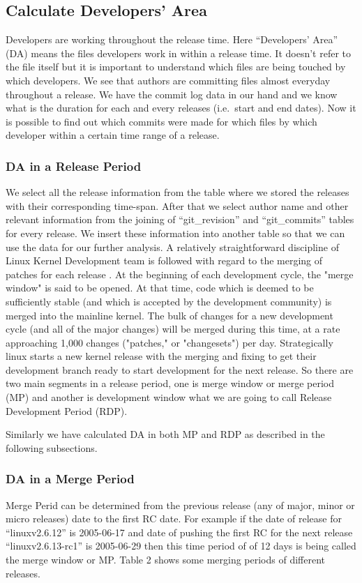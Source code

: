 \documentclass{acm_proc_article-sp}
\begin{document}
\subsection{Calculate Developers' Area}
Developers are working throughout the release time. Here ``Developers' Area'' (DA) means the files developers work in within a release time. It doesn't refer to the file itself but it is important to understand which files are being touched by which developers. We see that authors are committing files almost everyday throughout a release. We have the commit log data in our hand and we know what is the duration for each and every releases (i.e.\ start and end dates). Now it is possible to find out which commits were made for which files by which developer within a certain time range of a release.

\subsubsection{DA in a Release Period}
We select all the release information from the table where we stored the releases with their corresponding time-span. After that we select author name and other relevant information from the joining of ``git\_revision'' and ``git\_commits'' tables for every release. We insert these information into another table so that we can use the data for our further analysis. A relatively straightforward discipline of Linux Kernel Development team is followed with regard to the merging of patches for each release \cite{linux_kernel}.  At the beginning of each development cycle, the "merge window" is said to be opened.  At that time, code which is deemed to be sufficiently stable (and which is accepted by the development community) is merged into the mainline kernel. The bulk of changes for a new development cycle (and all of the major changes) will be merged during this time, at a rate approaching 1,000 changes ("patches," or "changesets") per day. Strategically linux starts a new kernel release with the merging and fixing to get their development branch ready to start development for the next release. So there are two main segments in a release period, one is merge window or merge period (MP) and another is development window what we are going to call Release Development Period (RDP).

Similarly we have calculated DA in both MP and RDP as described in the following subsections.

\subsubsection{DA in a Merge Period}
Merge Perid can be determined from the previous release (any of major, minor or micro releases) date to the first RC date. For example if the date of release for ``linuxv2.6.12''  is 2005-06-17 and date of pushing the first RC for the next release ``linuxv2.6.13-rc1'' is 2005-06-29 then this time period of of 12 days is being called the merge window \cite{14_kernel} or MP. Table 2 shows some merging periods of different releases.
\end{document}
